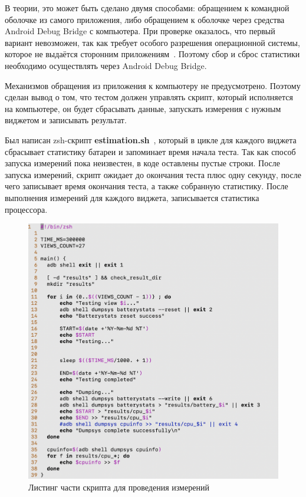 \documentclass[a4paper,14pt]{extarticle} %
\begin{document}
	В теории, это может быть сделано двумя способами: обращением к командной оболочке из самого приложения, либо обращением к оболочке через средства Android Debug Bridge с компьютера. При проверке оказалось, что первый вариант невозможен, так как требует особого разрешения операционной системы, которое не выдаётся сторонним приложениям~\parencite{Dump_Permission}. Поэтому сбор и сброс статистики необходимо осуществлять через Android Debug Bridge. 
	
	Механизмов обращения из приложения к компьютеру не предусмотрено. Поэтому сделан вывод о том, что тестом должен управлять скрипт, который исполняется на компьютере, он будет сбрасывать данные, запускать измерения с нужным виджетом и записывать результат.
	
	Был написан zsh-скрипт \textbf{estimation.sh}~\ris{\ref{fig:estimation}}, который в цикле для каждого виджета сбрасывает статистику батареи и запоминает время начала теста. Так как способ запуска измерений пока неизвестен, в коде оставлены пустые строки. После запуска измерений, скрипт ожидает до окончания теста плюс одну секунду, после чего записывает время окончания теста, а также собранную статистику. После выполнения измерений для каждого виджета, записывается статистика процессора.
	
	\begin{figure}[htb]
		\includegraphics[width=\textwidth]{estimation}
		\caption{Листинг части скрипта для проведения измерений}
		\label{fig:estimation}
	\end{figure}
	
\end{document}
